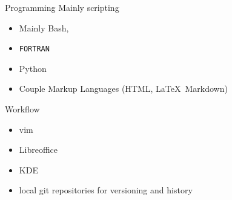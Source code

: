 \begin{frame}{Programming}
Mainly scripting

\begin{itemize}

\item Mainly Bash,
\item \texttt{FORTRAN}
\item Python
\item Couple Markup Languages (HTML, \LaTeX\, Markdown)

\end{itemize}

\end{frame}

\begin{frame}{Workflow}

\begin{itemize}
\item vim
\item Libreoffice
\item KDE
\item local git repositories for versioning and history

\end{itemize}

\end{frame}

